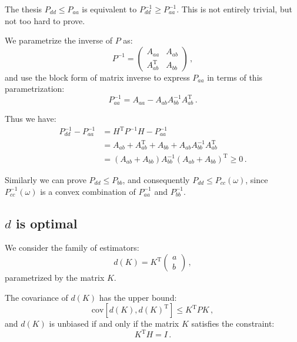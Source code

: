 \documentclass[11pt]{article}
\newcommand{\cov}{\mathrm{cov}}
\newcommand{\transpose}{\mathrm{\scriptscriptstyle T}}
\begin{document}
The thesis $P_{dd} \leq P_{aa}$ is equivalent to $P_{dd}^{-1} \geq
P_{aa}^{-1}$. This is not entirely trivial, but not too hard to prove.

We parametrize the inverse of $P$ as:
\begin{equation}
    P^{-1}=\begin{pmatrix}A_{aa}& A_{ab}\\ A_{ab}^\transpose & A_{bb} \end{pmatrix}\,,
\end{equation}
and use the block form of matrix inverse to express $P_{aa}$ in terms of this
parametrization:
\begin{equation}
    P_{aa}^{-1} = A_{aa} - A_{ab} A_{bb}^{-1} A_{ab}^\transpose\,.
\end{equation}

Thus we have:
\begin{align}
    P_{dd}^{-1} - P_{aa}^{-1} &= H^\transpose P^{-1} H - P_{aa}^{-1} \\
    &= A_{ab} + A_{ab}^\transpose + A_{bb} + A_{ab}A_{bb}^{-1}A_{ab}^\transpose\\
    &=(A_{ab} + A_{bb})A_{bb}^{-1}(A_{ab} + A_{bb})^\transpose \geq 0\,.
\end{align}

Similarly we can prove $P_{dd} \leq P_{bb}$, and consequently $P_{dd} \leq
P_{cc}(\omega)$, since $P_{cc}^{-1}(\omega)$ is a convex combination of
$P_{aa}^{-1}$ and $P_{bb}^{-1}$.

\subsection{$d$ is optimal}
\label{proof_d_is_optimal}
We consider the family of estimators:
\begin{equation}
d(K) = K^\transpose\begin{pmatrix}a\\b\end{pmatrix}\,,
\end{equation}
parametrized by the matrix $K$.

The covariance of $d(K)$ has the upper bound:
\begin{equation}
    \cov[d(K), d(K)^\transpose] \le K^\transpose P K\,,
\end{equation}
and $d(K)$ is unbiased if and only if the matrix $K$ satisfies the constraint:
\begin{equation}
    K^\transpose H = I\,.
\end{equation} 
\end{document}
